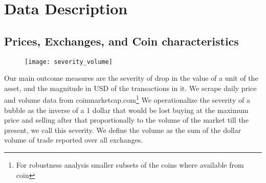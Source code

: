 \section{Data Description}

\subsection{Prices, Exchanges, and Coin characteristics}


\begin{figure}[h]
\texttt{[image: severity\_volume]}
\end{figure}

Our main outcome measures are the severity of drop in the value of a unit of the asset, and the magnitude in USD of the transactions in it.
We scrape daily price and volume data from coinmarketcap.com\footnote{ For robustness analysis smaller subsets of the coins where available from coin }
We operationalize the severity of a bubble as the inverse of a 1 dollar that would be lost buying at the maximum price and selling after that proportionally to the volume of the market till the present, we call this severity.
We define the volume as the sum of the dollar volume of trade reported over all exchanges.
